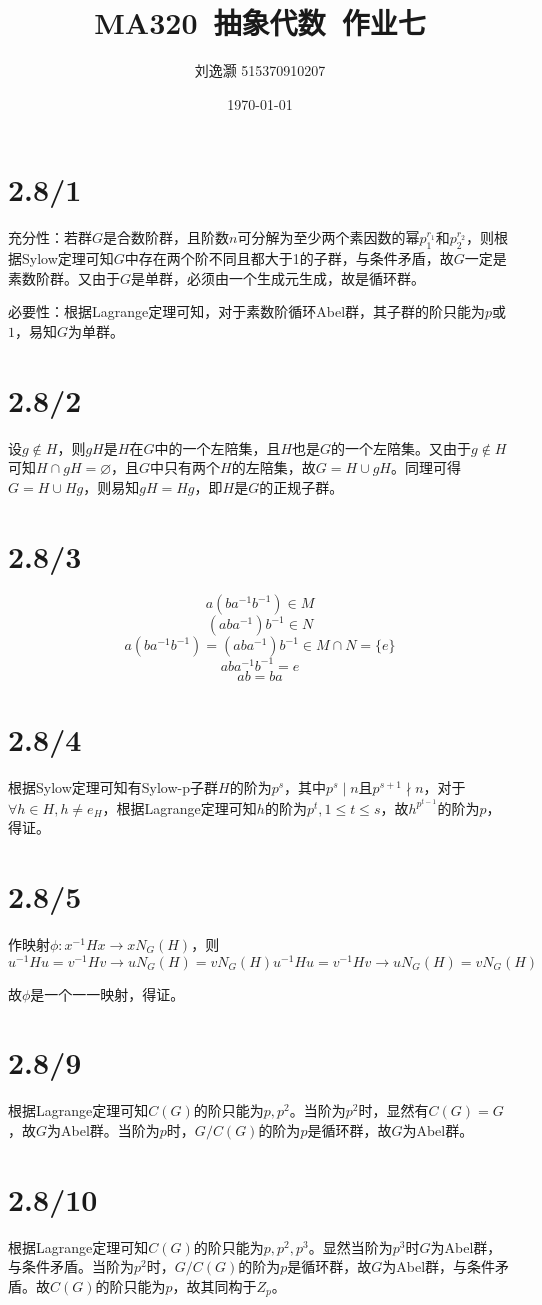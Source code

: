 \documentclass{article}
\title{MA320\ 抽象代数\ 作业七}
\author{刘逸灏 515370910207}
\date{\today}
\begin{document}
\maketitle

\section{2.8/1}
充分性：若群$G$是合数阶群，且阶数$n$可分解为至少两个素因数的幂$p_1^{r_1}$和$p_2^{r_2}$，则根据Sylow定理可知$G$中存在两个阶不同且都大于1的子群，与条件矛盾，故$G$一定是素数阶群。又由于$G$是单群，必须由一个生成元生成，故是循环群。

必要性：根据Lagrange定理可知，对于素数阶循环Abel群，其子群的阶只能为$p$或$1$，易知$G$为单群。

\section{2.8/2}
设$g\not\in H$，则$gH$是$H$在$G$中的一个左陪集，且$H$也是$G$的一个左陪集。又由于$g\not\in H$可知$H\cap gH=\varnothing$，且$G$中只有两个$H$的左陪集，故$G=H\cup gH$。同理可得$G=H\cup Hg$，则易知$gH=Hg$，即$H$是$G$的正规子群。

\section{2.8/3}
$$a(ba^{-1}b^{-1})\in M$$
$$(aba^{-1})b^{-1}\in N$$
$$a(ba^{-1}b^{-1})=(aba^{-1})b^{-1}\in M\cap N=\{e\}$$
$$aba^{-1}b^{-1}=e$$
$$ab=ba$$

\section{2.8/4}
根据Sylow定理可知有Sylow-p子群$H$的阶为$p^s$，其中$p^s\mid n$且$p^{s+1}\nmid n$，对于$\forall h\in H,h\neq e_H$，根据Lagrange定理可知$h$的阶为$p^t,1\leqslant t\leqslant s$，故$h^{p^{t-1}}$的阶为$p$，得证。

\section{2.8/5}
作映射$\phi:x^{-1}Hx\to xN_G(H)$，则
$$u^{-1}Hu=v^{-1}Hv\to uN_G(H)=vN_G(H)u^{-1}Hu=v^{-1}Hv\to uN_G(H)=vN_G(H)$$

故$\phi$是一个一一映射，得证。

\section{2.8/9}
根据Lagrange定理可知$C(G)$的阶只能为$p,p^2$。当阶为$p^2$时，显然有$C(G)=G$，故$G$为Abel群。当阶为$p$时，$G/C(G)$的阶为$p$是循环群，故$G$为Abel群。

\section{2.8/10}
根据Lagrange定理可知$C(G)$的阶只能为$p,p^2,p^3$。显然当阶为$p^3$时$G$为Abel群，与条件矛盾。当阶为$p^2$时，$G/C(G)$的阶为$p$是循环群，故$G$为Abel群，与条件矛盾。故$C(G)$的阶只能为$p$，故其同构于$Z_p$。
\end{document}
